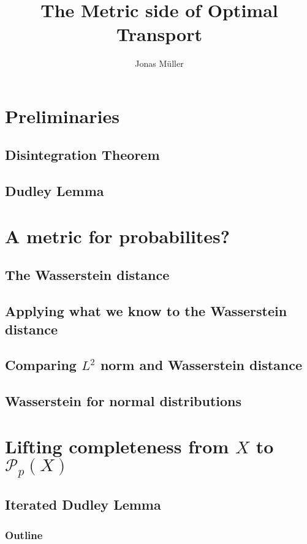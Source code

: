 \documentclass[10pt]{beamer}
\author[Jonas Müller]{Jonas Müller}
\begin{document}
\title[Wasserstein Metric]{The Metric side of Optimal Transport}
\institute{}
\date{}

\begin{frame}
    \titlepage
\end{frame}

\section{Preliminaries}
\subsection{Disintegration Theorem}
\subsection{Dudley Lemma}
\section{A metric for probabilites?}
\subsection{The Wasserstein distance}
\subsection{Applying what we know to the Wasserstein distance}
\subsection{Comparing $L^2$ norm and Wasserstein distance}
\subsection{Wasserstein for normal distributions}

\section{Lifting completeness from $X$ to $\mathcal{P}_p(X)$}
\subsection{Iterated Dudley Lemma}
\begin{frame}
    \frametitle{Outline}
    \tableofcontents
\end{frame}
\end{document}
